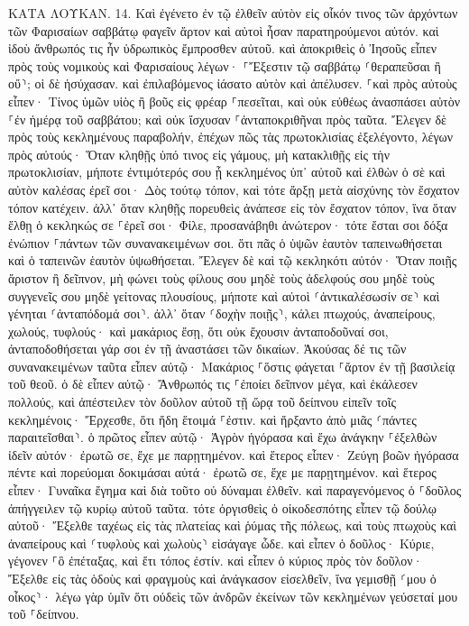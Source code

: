 \documentclass[twoside, 9pt]{extreport}
\begin{document}
ΚΑΤΑ ΛΟΥΚΑΝ.
14.
Καὶ ἐγένετο ἐν τῷ ἐλθεῖν αὐτὸν εἰς οἶκόν τινος τῶν ἀρχόντων τῶν Φαρισαίων σαββάτῳ φαγεῖν ἄρτον καὶ αὐτοὶ ἦσαν παρατηρούμενοι αὐτόν. 
καὶ ἰδοὺ ἄνθρωπός τις ἦν ὑδρωπικὸς ἔμπροσθεν αὐτοῦ. 
καὶ ἀποκριθεὶς ὁ Ἰησοῦς εἶπεν πρὸς τοὺς νομικοὺς καὶ Φαρισαίους λέγων· ⸀Ἔξεστιν τῷ σαββάτῳ ⸂θεραπεῦσαι ἢ οὔ⸃; 
οἱ δὲ ἡσύχασαν. καὶ ἐπιλαβόμενος ἰάσατο αὐτὸν καὶ ἀπέλυσεν. 
⸀καὶ πρὸς αὐτοὺς εἶπεν· Τίνος ὑμῶν υἱὸς ἢ βοῦς εἰς φρέαρ ⸀πεσεῖται, καὶ οὐκ εὐθέως ἀνασπάσει αὐτὸν ⸀ἐν ἡμέρᾳ τοῦ σαββάτου; 
καὶ οὐκ ἴσχυσαν ⸀ἀνταποκριθῆναι πρὸς ταῦτα. 
Ἔλεγεν δὲ πρὸς τοὺς κεκλημένους παραβολήν, ἐπέχων πῶς τὰς πρωτοκλισίας ἐξελέγοντο, λέγων πρὸς αὐτούς· 
Ὅταν κληθῇς ὑπό τινος εἰς γάμους, μὴ κατακλιθῇς εἰς τὴν πρωτοκλισίαν, μήποτε ἐντιμότερός σου ᾖ κεκλημένος ὑπ᾽ αὐτοῦ 
καὶ ἐλθὼν ὁ σὲ καὶ αὐτὸν καλέσας ἐρεῖ σοι· Δὸς τούτῳ τόπον, καὶ τότε ἄρξῃ μετὰ αἰσχύνης τὸν ἔσχατον τόπον κατέχειν. 
ἀλλ᾽ ὅταν κληθῇς πορευθεὶς ἀνάπεσε εἰς τὸν ἔσχατον τόπον, ἵνα ὅταν ἔλθῃ ὁ κεκληκώς σε ⸀ἐρεῖ σοι· Φίλε, προσανάβηθι ἀνώτερον· τότε ἔσται σοι δόξα ἐνώπιον ⸀πάντων τῶν συνανακειμένων σοι. 
ὅτι πᾶς ὁ ὑψῶν ἑαυτὸν ταπεινωθήσεται καὶ ὁ ταπεινῶν ἑαυτὸν ὑψωθήσεται. 
Ἔλεγεν δὲ καὶ τῷ κεκληκότι αὐτόν· Ὅταν ποιῇς ἄριστον ἢ δεῖπνον, μὴ φώνει τοὺς φίλους σου μηδὲ τοὺς ἀδελφούς σου μηδὲ τοὺς συγγενεῖς σου μηδὲ γείτονας πλουσίους, μήποτε καὶ αὐτοὶ ⸂ἀντικαλέσωσίν σε⸃ καὶ γένηται ⸂ἀνταπόδομά σοι⸃. 
ἀλλ᾽ ὅταν ⸂δοχὴν ποιῇς⸃, κάλει πτωχούς, ἀναπείρους, χωλούς, τυφλούς· 
καὶ μακάριος ἔσῃ, ὅτι οὐκ ἔχουσιν ἀνταποδοῦναί σοι, ἀνταποδοθήσεται γάρ σοι ἐν τῇ ἀναστάσει τῶν δικαίων. 
Ἀκούσας δέ τις τῶν συνανακειμένων ταῦτα εἶπεν αὐτῷ· Μακάριος ⸀ὅστις φάγεται ⸀ἄρτον ἐν τῇ βασιλείᾳ τοῦ θεοῦ. 
ὁ δὲ εἶπεν αὐτῷ· Ἄνθρωπός τις ⸀ἐποίει δεῖπνον μέγα, καὶ ἐκάλεσεν πολλούς, 
καὶ ἀπέστειλεν τὸν δοῦλον αὐτοῦ τῇ ὥρᾳ τοῦ δείπνου εἰπεῖν τοῖς κεκλημένοις· Ἔρχεσθε, ὅτι ἤδη ἕτοιμά ⸀ἐστιν. 
καὶ ἤρξαντο ἀπὸ μιᾶς ⸂πάντες παραιτεῖσθαι⸃. ὁ πρῶτος εἶπεν αὐτῷ· Ἀγρὸν ἠγόρασα καὶ ἔχω ἀνάγκην ⸀ἐξελθὼν ἰδεῖν αὐτόν· ἐρωτῶ σε, ἔχε με παρῃτημένον. 
καὶ ἕτερος εἶπεν· Ζεύγη βοῶν ἠγόρασα πέντε καὶ πορεύομαι δοκιμάσαι αὐτά· ἐρωτῶ σε, ἔχε με παρῃτημένον. 
καὶ ἕτερος εἶπεν· Γυναῖκα ἔγημα καὶ διὰ τοῦτο οὐ δύναμαι ἐλθεῖν. 
καὶ παραγενόμενος ὁ ⸀δοῦλος ἀπήγγειλεν τῷ κυρίῳ αὐτοῦ ταῦτα. τότε ὀργισθεὶς ὁ οἰκοδεσπότης εἶπεν τῷ δούλῳ αὐτοῦ· Ἔξελθε ταχέως εἰς τὰς πλατείας καὶ ῥύμας τῆς πόλεως, καὶ τοὺς πτωχοὺς καὶ ἀναπείρους καὶ ⸂τυφλοὺς καὶ χωλοὺς⸃ εἰσάγαγε ὧδε. 
καὶ εἶπεν ὁ δοῦλος· Κύριε, γέγονεν ⸀ὃ ἐπέταξας, καὶ ἔτι τόπος ἐστίν. 
καὶ εἶπεν ὁ κύριος πρὸς τὸν δοῦλον· Ἔξελθε εἰς τὰς ὁδοὺς καὶ φραγμοὺς καὶ ἀνάγκασον εἰσελθεῖν, ἵνα γεμισθῇ ⸂μου ὁ οἶκος⸃· 
λέγω γὰρ ὑμῖν ὅτι οὐδεὶς τῶν ἀνδρῶν ἐκείνων τῶν κεκλημένων γεύσεταί μου τοῦ ⸀δείπνου. 
\end{document}
